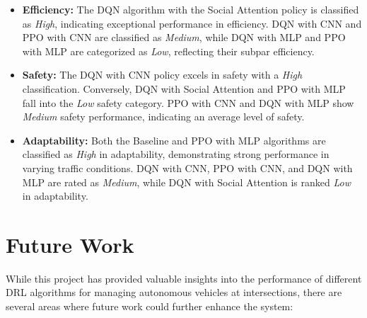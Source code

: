 \begin{itemize}
    \item \textbf{Efficiency:} The DQN algorithm with the Social Attention policy is classified as \textit{High}, indicating exceptional performance in efficiency. DQN with CNN and PPO with CNN are classified as \textit{Medium}, while DQN with MLP and PPO with MLP are categorized as \textit{Low}, reflecting their subpar efficiency.
    
    \item \textbf{Safety:} The DQN with CNN policy excels in safety with a \textit{High} classification. Conversely, DQN with Social Attention and PPO with MLP fall into the \textit{Low} safety category. PPO with CNN and DQN with MLP show \textit{Medium} safety performance, indicating an average level of safety.
    
    \item \textbf{Adaptability:} Both the Baseline and PPO with MLP algorithms are classified as \textit{High} in adaptability, demonstrating strong performance in varying traffic conditions. DQN with CNN, PPO with CNN, and DQN with MLP are rated as \textit{Medium}, while DQN with Social Attention is ranked \textit{Low} in adaptability.
\end{itemize}


\section{Future Work}

While this project has provided valuable insights into the performance of different DRL algorithms for managing autonomous vehicles at intersections, there are several areas where future work could further enhance the system:

